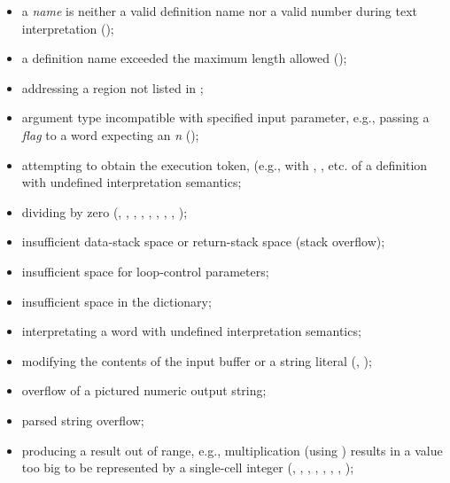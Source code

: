 \begin{itemize}

\item a \emph{name} is neither a valid definition name nor a valid
	number during text interpretation ();

\item a definition name exceeded the maximum length allowed
	();

\item addressing a region not listed in ;

\item argument type incompatible with specified input parameter,
	e.g., passing a \emph{flag} to a word expecting an \emph{n}
	();

\item attempting to obtain the execution token, (e.g., with
	, , etc. of a definition
	with undefined interpretation semantics;

\item dividing by zero
	(,
	 ,
	 ,
	 ,
	 ,
	 ,
	 ,
	 ,
	 );

\item insufficient data-stack space or return-stack space (stack
	overflow);

\item insufficient space for loop-control parameters;

\item insufficient space in the dictionary;

\item interpretating a word with undefined interpretation semantics;

\item modifying the contents of the input buffer or a string literal
	(,
	);

\item overflow of a pictured numeric output string;

\item parsed string overflow;

\item producing a result out of range, e.g., multiplication
	(using \word{*}) results in a value too big to be represented by
	a single-cell integer
	(,
	 ,
	 ,
	 ,
	 ,
	 ,
	 ,
	 );


\end{itemize}
